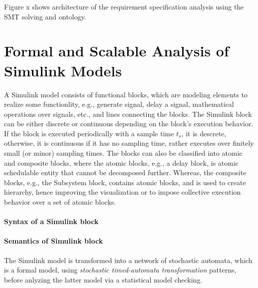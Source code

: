 Figure x shows architecture of the requirement specification analysis using the SMT solving and ontology. 

\section{Formal and Scalable Analysis of Simulink Models}
A Simulink model consists of functional blocks, which are modeling elements to realize some functionlity, e.g., generate signal, delay a signal, mathematical operations over signals, etc., and lines connecting the blocks. The Simulink block can be either discrete or continuous depending on the block's execution behavior. If the block is executed periodically with a sample time $t_s$, it is descrete, otherwise, it is continuous if it has no sampling time, rather executes over finitely small (or minor) sampling times. The blocks can also be classified into atomic and composite blocks, where the atomic blocks, e.g., a delay block, is atomic schedulable entity that cannot be decomposed further. Whereas, the composite blocks, e.g., the Subsystem block, contains atomic blocks, and is used to create hierarchy, hence improving the visualization or to impose collective execution behavior over a set of atomic blocks. 
\paragraph{Syntax of a Simulink block}
\paragraph{Semantics of Simulink block}
The Simulink model is transformed into a network of stochastic automata, which is a formal model, using \textit{stochastic timed-automata transformation} patterns, before anlyzing the latter model via a statistical model checking. 

